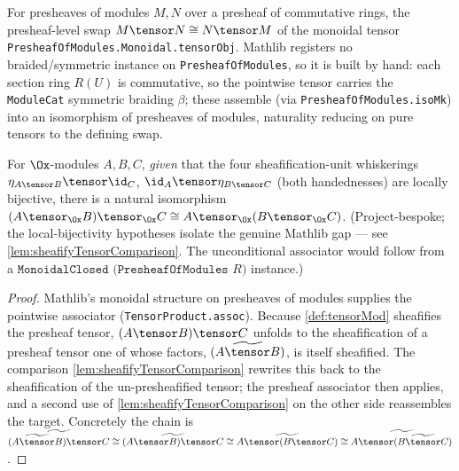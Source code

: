 \begin{definition}

  \label{def:presheafTensorBraiding}
  For presheaves of modules $M, N$ over a presheaf of commutative rings, the
  presheaf-level swap $M \tensor N \cong N \tensor M$ of the monoidal tensor
  \texttt{PresheafOfModules.Monoidal.tensorObj}. Mathlib registers no
  braided/symmetric instance on \texttt{PresheafOfModules}, so it is built by hand:
  each section ring $R(U)$ is commutative, so the pointwise tensor carries the
  \texttt{ModuleCat} symmetric braiding $\beta$; these assemble (via
  \texttt{PresheafOfModules.isoMk}) into an isomorphism of presheaves of modules,
  naturality reducing on pure tensors to the defining swap.
\end{definition}

\begin{lemma}
  \label{lem:tensorMod_assoc}
  For $\Ox$-modules $A, B, C$, \emph{given} that the four sheafification-unit
  whiskerings $\eta_{A\tensor B}\tensor\id_C$, $\id_A\tensor\eta_{B\tensor C}$
  (both handednesses) are locally bijective, there is a natural isomorphism
  $(A \tensor_{\Ox} B) \tensor_{\Ox} C \cong A \tensor_{\Ox} (B \tensor_{\Ox} C)$.
  (Project-bespoke; the local-bijectivity hypotheses isolate the genuine Mathlib
  gap — see \cref{lem:sheafifyTensorComparison}. The unconditional associator
  would follow from a $\texttt{MonoidalClosed (PresheafOfModules }R)$ instance.)
  \begin{proof}
    Mathlib's monoidal structure on presheaves of modules supplies the pointwise
    associator (\texttt{TensorProduct.assoc}). Because \cref{def:tensorMod}
    sheafifies the presheaf tensor, $(A \tensor B)\tensor C$ unfolds to the
    sheafification of a presheaf tensor one of whose factors,
    $(\widetilde{A\tensor B})$, is itself sheafified. The comparison
    \cref{lem:sheafifyTensorComparison} rewrites this back to the sheafification of
    the un-presheafified tensor; the presheaf associator then applies, and a second
    use of \cref{lem:sheafifyTensorComparison} on the other side reassembles the
    target. Concretely the chain is
    $\widetilde{(\widetilde{A\tensor B})\tensor C}
       \cong \widetilde{(A\tensor B)\tensor C}
       \cong \widetilde{A\tensor(B\tensor C)}
       \cong \widetilde{A\tensor(\widetilde{B\tensor C})}$.
  \end{proof}
\end{lemma}

